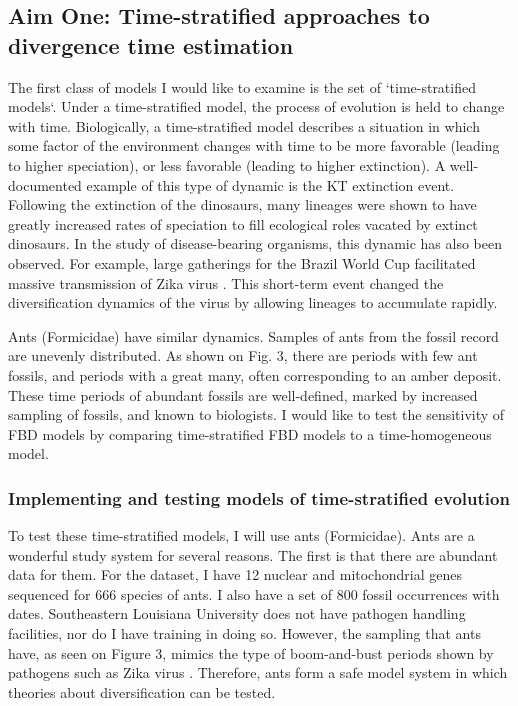 \documentclass[]{article}
\begin{document}
\subsection*{Aim One: Time-stratified approaches to divergence time estimation}
The first class of models I would like to examine is the set of `time-stratified models`. 
Under a time-stratified model, the process of evolution is held to change with time.
Biologically, a time-stratified model describes a situation in which some factor of the environment changes with time to be more favorable (leading to higher speciation), or less favorable (leading to higher extinction).
A well-documented example of this type of dynamic is the KT extinction event.
Following the extinction of the dinosaurs, many lineages \cite{brusatte2016, Longrich15253, longrich2012mass} were shown to have greatly increased rates of speciation to fill ecological roles vacated by extinct dinosaurs.
In the study of disease-bearing organisms, this dynamic has also been observed.
For example, large gatherings for the Brazil World Cup facilitated massive transmission of Zika virus \cite{rife2017phylodynamic}.
This short-term event changed the diversification dynamics of the virus by allowing lineages to accumulate rapidly. \par
Ants (Formicidae) have similar dynamics. 
Samples of ants from the fossil record are unevenly distributed. 
As shown on Fig. 3, there are periods with few ant fossils, and periods with a great many, often corresponding to an amber deposit.
These time periods of abundant fossils are well-defined, marked by increased sampling of fossils, and known to biologists.
I would like to test the sensitivity of FBD models by comparing time-stratified FBD models to a time-homogeneous model. \par

\subsubsection*{Implementing and testing models of time-stratified evolution}

To test these time-stratified models, I will use ants (Formicidae).
Ants are a wonderful study system for several reasons.
The first is that there are abundant data for them.
For the dataset, I have 12 nuclear and mitochondrial genes sequenced for 666 species of ants.
I also have a set of 800 fossil occurrences with dates. 
Southeastern Louisiana University does not have pathogen handling facilities, nor do I have training in doing so.
However, the sampling that ants have, as seen on Figure 3, mimics the type of boom-and-bust periods shown by pathogens such as Zika virus \cite{boskova}. 
Therefore, ants form a safe model system in which theories about diversification can be tested. \par
\end{document}
